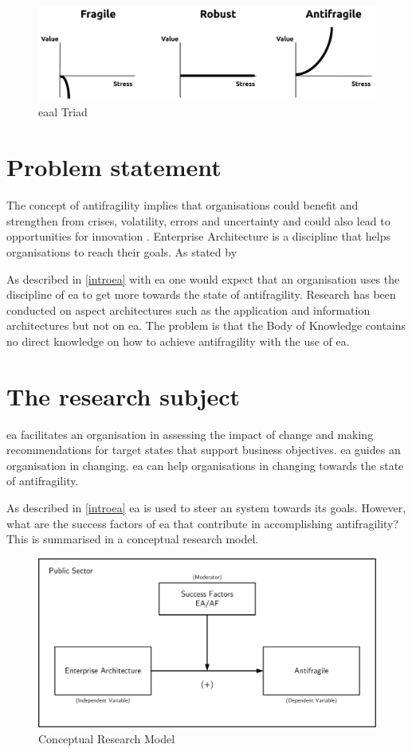 \begin{figure}[h!]
	\centering
	\includegraphics[width=0.7\linewidth]{images/eaal-triad}
	\caption[EAAL Triad]{\acrshort{eaal} Triad \parencite{Botjes2020}}
	\label{fig:eaal-triad}
\end{figure}

\section{Problem statement}
\label{sec:problemstatement}
The concept of \gls{antifragility} implies that organisations could benefit and strengthen from crises, volatility, errors and uncertainty and could also lead to opportunities for innovation \parencite{Kastner2017}. Enterprise Architecture is a discipline that helps organisations to reach their goals. As stated by 

As described in \ref{introea} with \acrshort{ea} one would expect that an organisation uses the discipline of \acrshort{ea} to get more towards the state of \gls{antifragility}. Research has been conducted on aspect architectures such as the application and information architectures but not on \acrshort{ea}. The problem is that the Body of Knowledge contains no direct knowledge on how to achieve \gls{antifragility} with the use of \acrshort{ea}. 

\section{The research subject}
\label{sec:researchsubject}
\acrshort{ea} facilitates an organisation in assessing the impact of change and making recommendations for target states that support business objectives. \acrshort{ea} guides an organisation in changing. \acrshort{ea} can help organisations in changing towards the state of \gls{antifragility}.

As described in \ref{introea} \acrshort{ea} is used to steer an system towards its goals. However, what are the success factors of \acrshort{ea} that contribute in accomplishing \gls{antifragility}? This is summarised in a conceptual research model.
\begin{figure}[H]
	\centering
	\includegraphics[width=0.8\linewidth]{images/conceptualmodel}
	\caption[Conceptual Research Model]{Conceptual Research Model}
	\label{fig:conceptualmodel}
\end{figure}

